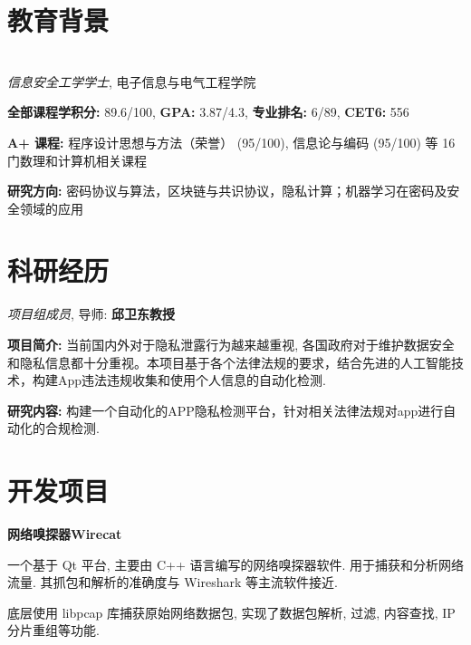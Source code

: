 \documentclass{cv_cn}
\begin{document}
\section{教育背景}
  \\
\textit{信息安全工学学士}, 电子信息与电气工程学院 \\

\begin{zitemize}
  \item \textbf{全部课程学积分:} 89.6/100, 
        \textbf{GPA:} 3.87/4.3, 
        \textbf{专业排名:} 6/89, 
        \textbf{CET6:} 556
  \item \textbf{A+ 课程:} 
        程序设计思想与方法（荣誉） (95/100),
        信息论与编码 (95/100) 
        等 16 门数理和计算机相关课程
  \item \textbf{研究方向:} 
        密码协议与算法，区块链与共识协议，隐私计算；机器学习在密码及安全领域的应用
\end{zitemize}

\section{科研经历}
\textit{项目组成员}, 导师: \textbf{邱卫东教授} 
\begin{zitemize}
  \item \textbf{项目简介:} 当前国内外对于隐私泄露行为越来越重视, 各国政府对于维护数据安全和隐私信息都十分重视。本项目基于各个法律法规的要求，结合先进的人工智能技术，构建App违法违规收集和使用个人信息的自动化检测.
  \item \textbf{研究内容:} 构建一个自动化的APP隐私检测平台，针对相关法律法规对app进行自动化的合规检测.
\end{zitemize}



\section{开发项目}
\textbf{网络嗅探器Wirecat}\enskip \underline{\href{https://github.com/WxxW2002/WireCat}{\faGithub}}
\begin{zitemize}
  \item 一个基于 Qt 平台, 主要由 C++ 语言编写的网络嗅探器软件. 用于捕获和分析网络流量. 其抓包和解析的准确度与 Wireshark 等主流软件接近.
  \item 底层使用 libpcap 库捕获原始网络数据包, 实现了数据包解析, 过滤, 内容查找, IP 分片重组等功能.
\end{zitemize}
\end{document}
